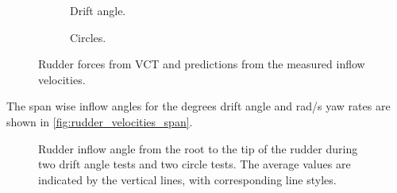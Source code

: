 \begin{figure}[h]
     \centering
     \begin{subfigure}[b]{\textwidth}
         \centering
         
        \caption{Drift angle.}
        \label{fig:inflow_to_force_drift_angle}
     \end{subfigure}
     \vfill
     \begin{subfigure}[b]{\textwidth}
         
        \caption{Circles.}
        \label{fig:inflow_to_force_circle}
     \end{subfigure}
        \caption{Rudder forces from VCT and predictions from the measured inflow velocities.}
        \label{fig:inflow_to_rudder_force}
\end{figure}
The span wise inflow angles for the  degrees drift angle and  rad/s yaw rates are shown in \autoref{fig:rudder_velocities_span}.
\begin{figure}[h]
    \centering 
    
    \caption{Rudder inflow angle from the root to the tip of the rudder during two drift angle tests and two circle tests. The average values are indicated by the vertical lines, with corresponding line styles.}
     \label{fig:rudder_velocities_span}
\end{figure}
